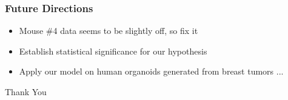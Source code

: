 \documentclass{beamer} %
\begin{document}
\begin{frame}
	\frametitle{Future Directions}
	\begin{itemize}
			\item Mouse \#4 data seems to be slightly off, so fix it
			\item Establish statistical significance for our hypothesis 
			\item Apply our model on human organoids generated from breast tumors 
			\newline
			...
	\end{itemize}
\end{frame}

\begin{frame}
	\centering
	Thank You
\end{frame}

%
%
%
%
%



\end{document}

